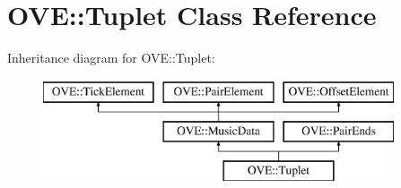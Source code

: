 \hypertarget{class_o_v_e_1_1_tuplet}{}\section{O\+VE\+:\+:Tuplet Class Reference}
\label{class_o_v_e_1_1_tuplet}
Inheritance diagram for O\+VE\+:\+:Tuplet\+:\begin{figure}[H]
\begin{center}
\leavevmode
\includegraphics[height=3.000000cm]{class_o_v_e_1_1_tuplet}
\end{center}
\end{figure}
